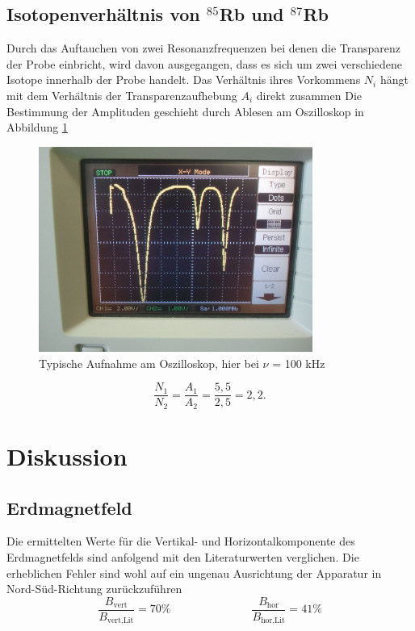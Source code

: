\subsection{Isotopenverhältnis von $^{85}$Rb und $^{87}$Rb}
Durch das Auftauchen von zwei Resonanzfrequenzen bei denen die Transparenz der Probe einbricht, wird davon ausgegangen, dass es sich um zwei verschiedene
Isotope innerhalb der Probe handelt. Das Verhältnis ihres Vorkommens $N_i$ hängt mit dem Verhältnis der Transparenzaufhebung $A_i$ direkt zusammen
Die Bestimmung der Amplituden geschieht durch Ablesen am Oszilloskop in Abbildung \ref{pic_verh}
\begin{figure}[h]
\includegraphics[width=0.8\textwidth]{../pics/v21Verh.jpg}
\caption{Typische Aufnahme am Oszilloskop, hier bei $\nu$ = 100 kHz}
\label{pic_verh}
\end{figure}\begin{equation}
 \frac{N_1}{N_2} = \frac{A_1}{A_2} = \frac{5,5}{2,5}= 2,2.
\end{equation}

\section{Diskussion}
\subsection{Erdmagnetfeld}
Die ermittelten Werte für die Vertikal- und Horizontalkomponente des Erdmagnetfelds sind anfolgend mit den Literaturwerten \cite{ErdB} verglichen. Die erheblichen
Fehler sind wohl auf ein ungenau Ausrichtung der Apparatur in Nord-Süd-Richtung zurückzuführen
\begin{equation}
 \frac{B_{\text{vert}}}{B_{\text{vert,Lit}}} = 70\% \hspace{3cm} \frac{B_{\text{hor}}}{B_{\text{hor,Lit}}} = 41\%
\end{equation}
